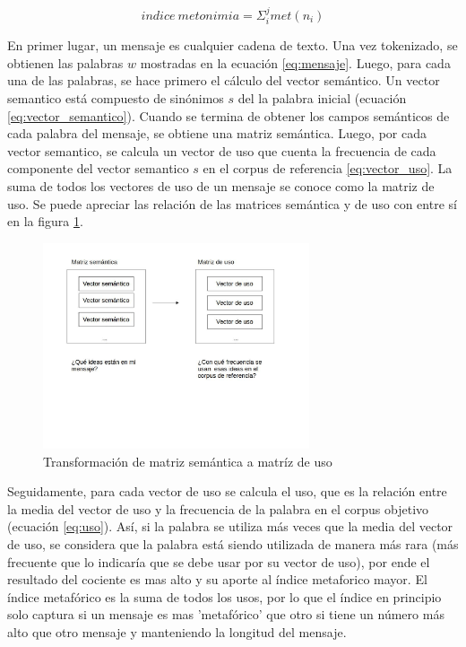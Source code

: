 \documentclass[12pt,letterpaper,twoside]{article}
\begin{document}
\begin{equation}\label{eq:indice_metonimia}
indice\ metonimia = \Sigma_i^j met(n_i)
\end{equation}


En primer lugar, un mensaje es cualquier cadena de texto. Una vez
tokenizado, se obtienen las palabras \(w\) mostradas en la ecuación
\ref{eq:mensaje}. Luego, para cada una de las palabras, se hace
primero el cálculo del vector semántico. Un vector semantico está
compuesto de sinónimos \(s\) del la palabra inicial (ecuación
\ref{eq:vector_semantico}). Cuando se termina de obtener los campos
semánticos de cada palabra del mensaje, se obtiene una matriz
semántica. Luego, por cada vector semantico, se calcula un vector de
uso que cuenta la frecuencia de cada componente del vector semantico
\(s\) en el corpus de referencia \ref{eq:vector_uso}. La suma de todos
los vectores de uso de un mensaje se conoce como la matriz de uso. Se
puede apreciar las relación de las matrices semántica y de uso con
entre sí en la figura \ref{fig:matrices}.

\begin{figure}[H]
\centering
\includegraphics[width=0.7\textwidth]{./assets/matrices.jpg}
\caption{\label{fig:matrices}Transformación de matriz semántica a matríz de uso}
\end{figure}

Seguidamente, para cada vector de uso se calcula el uso, que es la
relación entre la media del vector de uso y la frecuencia de la
palabra en el corpus objetivo (ecuación \ref{eq:uso}). Así, si la
palabra se utiliza más veces que la media del vector de uso, se
considera que la palabra está siendo utilizada de manera más rara (más
frecuente que lo indicaría que se debe usar por su vector de uso), por
ende el resultado del cociente es mas alto y su aporte al índice
metaforico mayor. El índice metafórico es la suma de todos los usos,
por lo que el índice en principio solo captura si un mensaje es mas
'metafórico' que otro si tiene un número más alto que otro mensaje y
manteniendo la longitud del mensaje.
\end{document}
